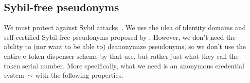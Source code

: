 \subsection{Sybil-free pseudonyms}%
\label{sybil-free-pseudonyms}

We must protect against Sybil attacks~\cite{SybilAttack}.
We use the idea of identity domains and self-certified Sybil-free pseudonyms 
proposed by \textcite{SybilFreePseudonyms}.
However, we don't need the ability to (nor want to be able to) deanonymize 
pseudonyms, so we don't use the entire e-token dispenser scheme by 
\textcite{HowToWinTheCloneWars} that 
\textcite{SybilFreePseudonyms} use, but rather just what they call 
the token serial number.
More specifically, what we need is an anonymous credential system~\(\AC\) with 
the following properties.


